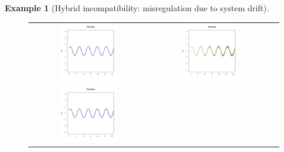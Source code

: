 \documentclass{article}
\newcommand{\1}{\mathbbm{1}}
\newtheorem{example}{Example}
\begin{document}
\begin{example}[Hybrid incompatibility: misregulation due to system drift]
\begin{figure}[H]
  \centering
  \begin{tabular}{ccc}
    \includegraphics[width=0.5\textwidth, height=0.125\paperheight]{examples/osc_F1_hundreth_tau0} &
      \includegraphics[width=0.5\textwidth, height=0.125\paperheight]{examples/osc_F2_hundrethtau0} \\
      \includegraphics[width=0.5\textwidth, height=0.125\paperheight]{examples/osc_F1_tenth_tau0.pdf} &

\end{tabular}
\end{figure}
\end{example}
\end{document}

